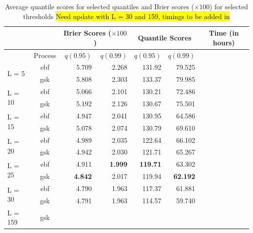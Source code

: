 \documentclass[11pt]{article}
\begin{document}
\begin{table}[htbp]
\caption{Average quantile scores for selected quantiles and Brier scores ($\times 100$) for selected thresholds \hl{Need update with L = 30 and 159, timings to be added in}}
\centering
\small
  \begin{tabular}{lc|rr|rr|c}
   \multicolumn{2}{c}{  }& \multicolumn{2}{|c|}{Brier Scores ($\times 100$)} & \multicolumn{2}{|c|}{Quantile Scores} & Time (in hours)\\
   \hline
   & Process & $q(0.95)$ & $q(0.99)$ & $q(0.95)$ & $q(0.99)$\\
   \hline
  \multirow{2}{*}{L = 5}  & ebf & 5.709 & 2.268 & 131.92 & 79.525 & \\
                          & gsk & 5.808 & 2.303 & 133.37 & 79.985 & \\
   \hline
  \multirow{2}{*}{L = 10} & ebf & 5.066 & 2.101 & 130.21 & 72.486 & \\
                          & gsk & 5.192 & 2.126 & 130.67 & 75.501 & \\
   \hline
  \multirow{2}{*}{L = 15} & ebf & 4.947 & 2.041 & 130.95 & 64.586 & \\
                          & gsk & 5.078 & 2.074 & 130.79 & 69.610 & \\
   \hline
  \multirow{2}{*}{L = 20} & ebf & 4.989 & 2.035 & 122.64 & 66.102 & \\
                          & gsk & 4.942 & 2.030 & 121.71 & 65.267 & \\
   \hline
  \multirow{2}{*}{L = 25} & ebf & 4.911 & \textbf{1.999} & \textbf{119.71} & 63.302 & \\
                          & gsk & \textbf{4.842} & 2.017 & 119.94 & \textbf{62.192} & \\
   \hline
  \multirow{2}{*}{L = 30} & ebf & 4.790 & 1.963 & 117.37 & 61.881 & \\
                          & gsk & 4.791 & 1.963 & 114.57 & 59.740 & \\
  \hline
  L = 159                 & gsk &  &  &  &  & \\
  \hline
	\end{tabular}
\end{table}

\end{document}
